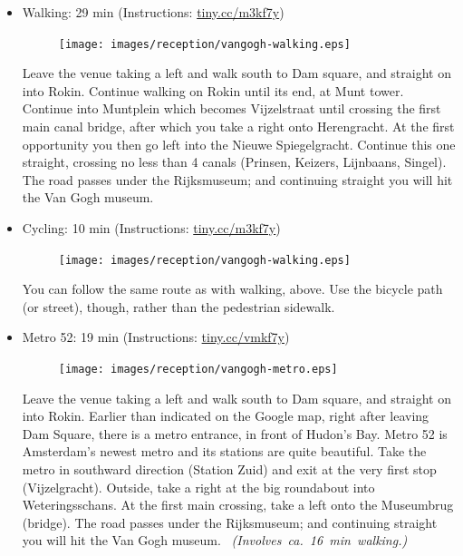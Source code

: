 \begin{itemize}

\item Walking: \hfill 29 min (Instructions: \url{tiny.cc/m3kf7y})

\begin{minipage}{.9\textwidth}
\begin{figure}
\vspace*{-1.2\baselineskip}%
\texttt{[image: images/reception/vangogh-walking.eps]}
\end{figure}
Leave the venue taking a left and walk south to Dam square, and straight on into Rokin. Continue walking on Rokin until its end, at Munt tower. Continue into Muntplein which becomes Vijzelstraat until crossing the first main canal bridge, after which you take a right onto Herengracht. At the first opportunity you then go left into the Nieuwe Spiegelgracht. Continue this one straight, crossing no less than 4 canals (Prinsen, Keizers, Lijnbaans, Singel). The road passes under the Rijksmuseum; and continuing straight you will hit the Van Gogh museum.
\end{minipage}

\item Cycling: \hfill 10 min (Instructions: \url{tiny.cc/m3kf7y})

\begin{minipage}{.9\textwidth}
\begin{figure}
\vspace*{-1.2\baselineskip}%
\texttt{[image: images/reception/vangogh-walking.eps]}
\end{figure}
You can follow the same route as with walking, above. Use the bicycle path (or street), though, rather than the pedestrian sidewalk.
\end{minipage}

\item Metro 52: \hfill 19 min (Instructions: \url{tiny.cc/vmkf7y})

\begin{minipage}{.9\textwidth}
\begin{figure}
\vspace*{-1.2\baselineskip}%
\texttt{[image: images/reception/vangogh-metro.eps]}
\end{figure}
Leave the venue taking a left and walk south to Dam square, and straight on into Rokin. Earlier than indicated on the Google map, right after leaving Dam Square, there is a metro entrance, in front of Hudon's Bay. Metro 52 is Amsterdam's newest metro and its stations are quite beautiful. Take the metro in southward direction (Station Zuid) and exit at the very first stop (Vijzelgracht). Outside, take a right at the big roundabout into Weteringsschans. At the first main crossing, take a left onto the Museumbrug (bridge). The road passes under the Rijksmuseum; and continuing straight you will hit the Van Gogh museum.
~\hspace*{\fill}\mbox{\emph{(Involves ca.\ 16 min walking.)}}
\end{minipage}


\end{itemize}
